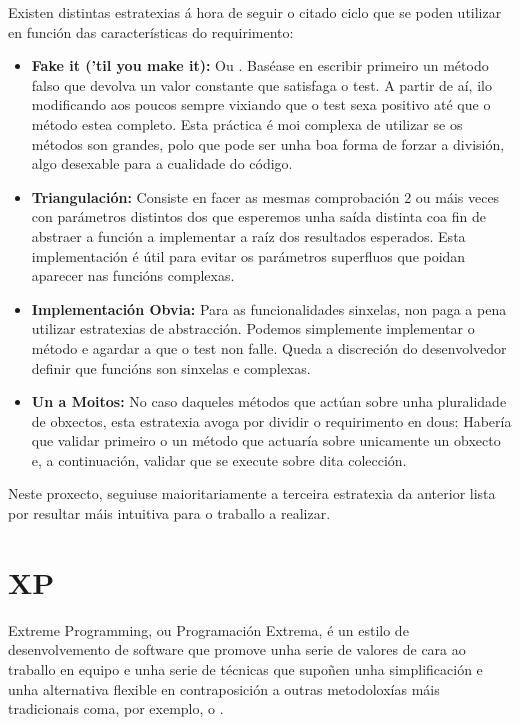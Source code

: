 Existen distintas estratexias á hora de seguir o citado ciclo \cite{tdd} que se poden utilizar en función das características do requirimento:

\begin{itemize}
	\item \textbf{Fake it ('til you make it):} Ou . Baséase en escribir primeiro un método falso que devolva un valor constante que satisfaga o test. A partir de aí, ilo modificando aos poucos sempre vixiando que o test sexa positivo até que o método estea completo. Esta práctica é moi complexa de utilizar se os métodos son grandes, polo que pode ser unha boa forma de forzar a división, algo desexable para a cualidade do código.
	
	\item \textbf{Triangulación:} Consiste en facer as mesmas comprobación 2 ou máis veces con parámetros distintos dos que esperemos unha saída distinta coa fin de abstraer a función a implementar a raíz dos resultados esperados. Esta implementación é útil para evitar os parámetros superfluos que poidan aparecer nas funcións complexas.
	
	\item \textbf{Implementación Obvia:} Para as funcionalidades sinxelas, non paga a pena utilizar estratexias de abstracción. Podemos simplemente implementar o método e agardar a que o test non falle. Queda a discreción do desenvolvedor definir que funcións son sinxelas e complexas.
	
	\item \textbf{Un a Moitos:} No caso daqueles métodos que actúan sobre unha pluralidade de obxectos, esta estratexia avoga por dividir o requirimento en dous: Habería que validar primeiro o un método que actuaría sobre unicamente un obxecto e, a continuación, validar que se execute sobre dita colección.  

\end{itemize}


Neste proxecto, seguiuse maioritariamente a terceira estratexia da anterior lista por resultar máis intuitiva para o traballo a realizar.

\section{XP}

Extreme Programming, ou Programación Extrema, é un estilo de desenvolvemento de software que promove unha serie de valores de cara ao traballo en equipo e unha serie de técnicas que supoñen unha simplificación e unha alternativa flexible en contraposición a outras metodoloxías máis tradicionais coma, por exemplo, o .

